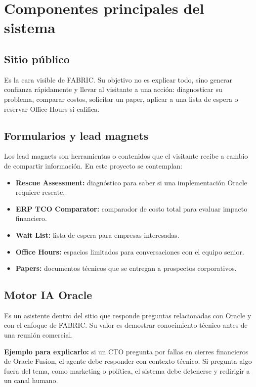 \documentclass[11pt,letterpaper]{article}
\begin{document}
\section{Componentes principales del sistema}

\subsection{Sitio p\'ublico}

Es la cara visible de FABRIC. Su objetivo no es explicar todo, sino generar confianza r\'apidamente y llevar al visitante a una acci\'on: diagnosticar su problema, comparar costos, solicitar un paper, aplicar a una lista de espera o reservar Office Hours si califica.

\subsection{Formularios y lead magnets}

Los lead magnets son herramientas o contenidos que el visitante recibe a cambio de compartir informaci\'on. En este proyecto se contemplan:

\begin{itemize}
\item \textbf{Rescue Assessment:} diagn\'ostico para saber si una implementaci\'on Oracle requiere rescate.
\item \textbf{ERP TCO Comparator:} comparador de costo total para evaluar impacto financiero.
\item \textbf{Wait List:} lista de espera para empresas interesadas.
\item \textbf{Office Hours:} espacios limitados para conversaciones con el equipo senior.
\item \textbf{Papers:} documentos t\'ecnicos que se entregan a prospectos corporativos.
\end{itemize}

\subsection{Motor IA Oracle}

Es un asistente dentro del sitio que responde preguntas relacionadas con Oracle y con el enfoque de FABRIC. Su valor es demostrar conocimiento t\'ecnico antes de una reuni\'on comercial.

\begin{executivebox}
\textbf{Ejemplo para explicarlo:} si un CTO pregunta por fallas en cierres financieros de Oracle Fusion, el agente debe responder con contexto t\'ecnico. Si pregunta algo fuera del tema, como marketing o pol\'itica, el sistema debe detenerse y redirigir a un canal humano.
\end{executivebox}
\end{document}
